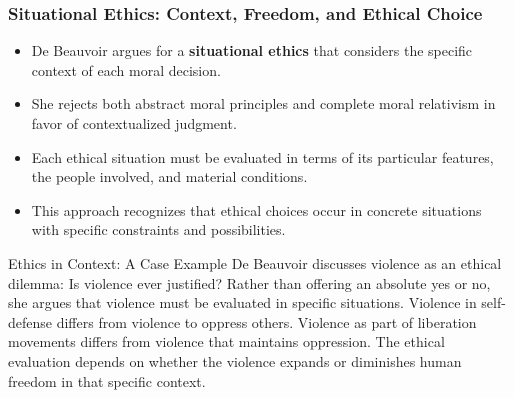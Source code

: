 \documentclass[aspectratio=169]{beamer}
\begin{document}
	\begin{frame}
		\frametitle{Situational Ethics: Context, Freedom, and Ethical Choice}
		\begin{itemize}
			\item De Beauvoir argues for a \textbf{situational ethics} that considers the specific context of each moral decision.
			\item She rejects both abstract moral principles and complete moral relativism in favor of contextualized judgment.
			\item Each ethical situation must be evaluated in terms of its particular features, the people involved, and material conditions.
			\item This approach recognizes that ethical choices occur in concrete situations with specific constraints and possibilities.
		\end{itemize}
		
		\begin{exampleblock}{Ethics in Context: A Case Example}
			De Beauvoir discusses violence as an ethical dilemma: Is violence ever justified? Rather than offering an absolute yes or no, she argues that violence must be evaluated in specific situations. Violence in self-defense differs from violence to oppress others. Violence as part of liberation movements differs from violence that maintains oppression. The ethical evaluation depends on whether the violence expands or diminishes human freedom in that specific context.
		\end{exampleblock}
	\end{frame}
	
\end{document}

